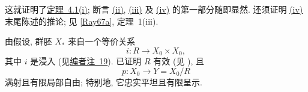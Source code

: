 这就证明了\hyperref[thm:sga3-V-4.1-i]{定理~4.1(i)};
断言 \hyperref[thm:sga3-V-4.1-ii]{(ii)},
\hyperref[thm:sga3-V-4.1-iii]{(iii)} 及
\hyperref[thm:sga3-V-4.1-iv]{(iv)} 的第一部分随即显然.
还须证明 \hyperref[thm:sga3-V-4.1-iv]{(iv)} 末尾陈述的推论;
见 \hyperref[bib:sga3-V-Ray67a]{[Ray67a]}, 定理~1(iii).

由假设, 群胚 \(X_\ast\) 来自一个等价关系
\[
  i:R\longrightarrow X_0\times X_0,
\]
其中 \(i\) 是浸入 (见\hyperref[note:sga3-V-19]{编者注~19}).
已证明 \(R\) 有效 (见 ), 且
\[
  p:X_0\longrightarrow Y=X_0/R
\]
满射且有限局部自由; 特别地, 它忠实平坦且有限呈示.

